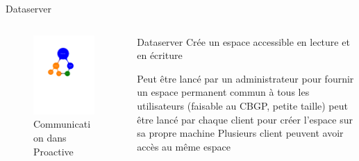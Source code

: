 \documentclass{beamer}
\begin{document}
\begin{frame}{Dataserver}
	\begin{columns}
	\begin{column}[l]{0.5\linewidth}
        \begin{figure}
            \centering
            \includegraphics[trim=4cm 13cm 2cm 5cm,scale=0.48]{netmap_abs.pdf}
            \caption{Communication dans Proactive}
        \end{figure}
	\end{column}
	\begin{column}[r]{0.5\linewidth}
        \begin{exampleblock}{Dataserver}
             Crée un espace accessible en lecture et en écriture

             Peut être lancé par un administrateur pour fournir un espace permanent commun à tous les utilisateurs (faisable au CBGP, petite taille)
             peut être lancé par chaque client pour créer l'espace sur sa propre machine
             Plusieurs client peuvent avoir accès au même espace
            
        \end{exampleblock}
        
	\end{column}
	\end{columns}
    
\end{frame}
\end{document}
